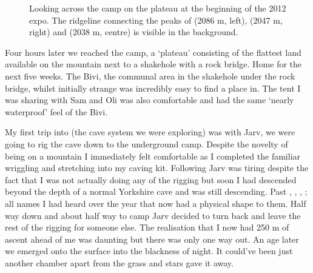 \begin{figure}[t!]
\checkoddpage \ifoddpage \forcerectofloat \else \forceversofloat \fi
{}
\caption{Looking across the camp on the  plateau at the beginning of the 2012 expo. The ridgeline connecting the peaks of  (2086 m, left),  (2047 m, right) and  (2038 m, centre) is visible in the background. } \label{plateau kuk}
\end{figure}


Four hours later we reached the camp, a ‘plateau’ consisting of the flattest land available on the mountain next to a shakehole with a rock bridge. Home for the next five weeks. The Bivi, the communal area in the shakehole under the rock bridge, whilst initially strange was incredibly easy to find a place in. The tent I was sharing with Sam and Oli was also comfortable and had the same ‘nearly waterproof’ feel of the Bivi.

My first trip into  (the cave system we were exploring) was with Jarv, we were going to rig the cave down to the underground camp. Despite the novelty of being on a mountain I immediately felt comfortable as I completed the familiar wriggling and stretching into my caving kit. Following Jarv was tiring despite the fact that I was not actually doing any of the rigging but soon I had descended beyond the depth of a normal Yorkshire cave and was still descending. Past , , , ; all names I had heard over the year that now had a physical shape to them. Half way down  and about half way to camp Jarv decided to turn back and leave the rest of the rigging for someone else. The realisation that I now had 250 m of ascent ahead of me was daunting but there was only one way out. An age later we emerged onto the surface into the blackness of night. It could’ve been just another chamber apart from the grass and stars gave it away.

